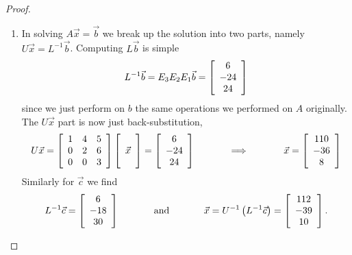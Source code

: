 \documentclass{tutorial}
\begin{document}
\begin{proof}
\begin{enumerate}[label=(\alph*)]
\item In solving $A \vec{x} = \vec{b}$ we break up the solution into two parts, namely $U \vec{x} = L^{-1} \vec{b}$. Computing $L \vec{b}$ is simple
\[ 
	L^{-1} \vec{b} = E_3E_2E_1 \vec{b}
	= \left[ \begin{array}{c}
		6 \\
		-24 \\
		24
	\end{array} \right]
\]
since we just perform on $b$ the same operations we performed on $A$ originally. The $U \vec{x}$ part is now just back-substitution,
\[ 
	U \vec{x}
	= \left[ \begin{array}{ccc}
		1&4&5 \\
		0&2&6\\
		0&0&3
	\end{array} \right]
	\left[ \begin{array}{c}
		\\
		\vec{x} \\
		\;
	\end{array} \right]
	= \left[ \begin{array}{c}
		6 \\
		-24 \\
		24
	\end{array} \right]
	\hspace{0.5in} \Longrightarrow \hspace{0.5in}
	\vec{x} = \left[ \begin{array}{c}
		110 \\
		-36 \\
		8
	\end{array} \right]
\]
Similarly for $\vec{c}$ we find
\[ 
	L^{-1} \vec{c}
	= \left[ \begin{array}{c}
		6 \\
		-18 \\
		30
	\end{array} \right]
	\hspace{0.5in} \mathrm{and} \hspace{0.5in} 
	\vec{x} = U^{-1} \left( L^{-1} \vec{c} \right)
	= \left[ \begin{array}{c}
		112 \\
		-39 \\
		10
	\end{array} \right] .
\]


\end{enumerate}
\end{proof}
\end{document}
